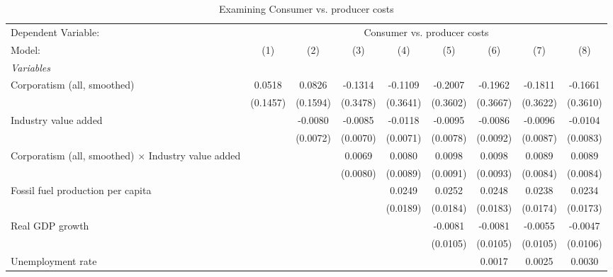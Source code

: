 
\begin{table}[htbp]
   \caption{Examining Consumer vs. producer costs}
   \centering
   \begin{tabular}{lcccccccc}
      \tabularnewline \midrule \midrule
      Dependent Variable: & \multicolumn{8}{c}{Consumer vs. producer costs}\\
      Model:                                                     & (1)      & (2)      & (3)      & (4)      & (5)      & (6)      & (7)      & (8)\\  
      \midrule
      \emph{Variables}\\
      Corporatism (all, smoothed)                                & 0.0518   & 0.0826   & -0.1314  & -0.1109  & -0.2007  & -0.1962  & -0.1811  & -0.1661\\   
                                                                 & (0.1457) & (0.1594) & (0.3478) & (0.3641) & (0.3602) & (0.3667) & (0.3622) & (0.3610)\\   
      Industry value added                                       &          & -0.0080  & -0.0085  & -0.0118  & -0.0095  & -0.0086  & -0.0096  & -0.0104\\   
                                                                 &          & (0.0072) & (0.0070) & (0.0071) & (0.0078) & (0.0092) & (0.0087) & (0.0083)\\   
      Corporatism (all, smoothed) $\times$ Industry value added  &          &          & 0.0069   & 0.0080   & 0.0098   & 0.0098   & 0.0089   & 0.0089\\   
                                                                 &          &          & (0.0080) & (0.0089) & (0.0091) & (0.0093) & (0.0084) & (0.0084)\\   
      Fossil fuel production per capita                          &          &          &          & 0.0249   & 0.0252   & 0.0248   & 0.0238   & 0.0234\\   
                                                                 &          &          &          & (0.0189) & (0.0184) & (0.0183) & (0.0174) & (0.0173)\\   
      Real GDP growth                                            &          &          &          &          & -0.0081  & -0.0081  & -0.0055  & -0.0047\\   
                                                                 &          &          &          &          & (0.0105) & (0.0105) & (0.0105) & (0.0106)\\   
      Unemployment rate                                          &          &          &          &          &          & 0.0017   & 0.0025   & 0.0030\\   

\end{tabular}
\end{table}
